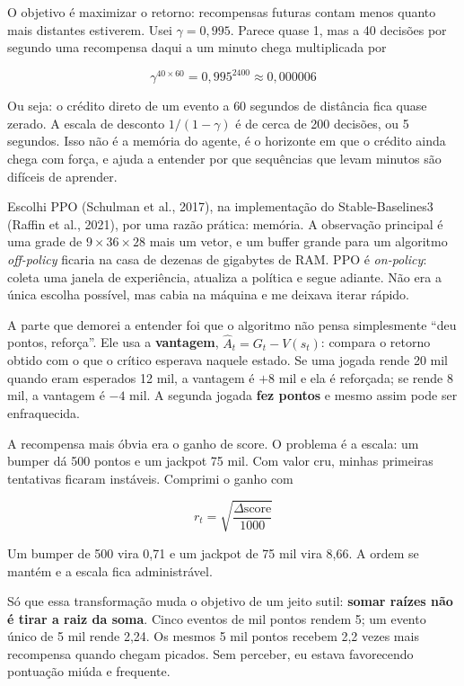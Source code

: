 \documentclass[10pt,a4paper,twoside,twocolumn]{scrartcl}
\begin{document}
O objetivo é maximizar o retorno: recompensas futuras contam menos
quanto mais distantes estiverem. Usei \(\gamma = 0{,}995\). Parece quase
1, mas a 40 decisões por segundo uma recompensa daqui a um minuto chega
multiplicada por

\[\gamma^{40 \times 60} = 0{,}995^{2400} \approx 0{,}000006\]

Ou seja: o crédito direto de um evento a 60 segundos de distância fica
quase zerado. A escala de desconto \(1/(1-\gamma)\) é de cerca de 200
decisões, ou 5 segundos. Isso não é a memória do agente, é o horizonte
em que o crédito ainda chega com força, e ajuda a entender por que
sequências que levam minutos são difíceis de aprender.

Escolhi PPO (Schulman et al., 2017), na implementação do
Stable-Baselines3 (Raffin et al., 2021), por uma razão prática: memória.
A observação principal é uma grade de \(9 \times 36 \times 28\) mais um
vetor, e um buffer grande para um algoritmo \emph{off-policy} ficaria na
casa de dezenas de gigabytes de RAM. PPO é \emph{on-policy}: coleta uma
janela de experiência, atualiza a política e segue adiante. Não era a
única escolha possível, mas cabia na máquina e me deixava iterar rápido.

A parte que demorei a entender foi que o algoritmo não pensa
simplesmente ``deu pontos, reforça''. Ele usa a \textbf{vantagem},
\(\hat{A}_t = G_t - V(s_t)\): compara o retorno obtido com o que o
crítico esperava naquele estado. Se uma jogada rende 20 mil quando eram
esperados 12 mil, a vantagem é \(+8\) mil e ela é reforçada; se rende 8
mil, a vantagem é \(-4\) mil. A segunda jogada \textbf{fez pontos} e
mesmo assim pode ser enfraquecida.

A recompensa mais óbvia era o ganho de score. O problema é a escala: um
bumper dá 500 pontos e um jackpot 75 mil. Com valor cru, minhas
primeiras tentativas ficaram instáveis. Comprimi o ganho com

\[r_t = \sqrt{\frac{\Delta \text{score}}{1000}}\]

Um bumper de 500 vira 0,71 e um jackpot de 75 mil vira 8,66. A ordem se
mantém e a escala fica administrável.

Só que essa transformação muda o objetivo de um jeito sutil:
\textbf{somar raízes não é tirar a raiz da soma}. Cinco eventos de mil
pontos rendem 5; um evento único de 5 mil rende 2,24. Os mesmos 5 mil
pontos recebem 2,2 vezes mais recompensa quando chegam picados. Sem
perceber, eu estava favorecendo pontuação miúda e frequente.
\end{document}
